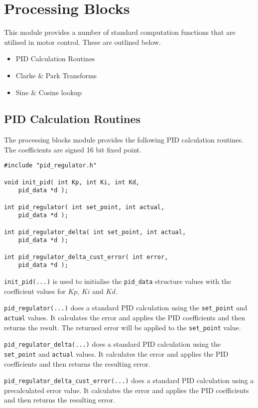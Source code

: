 \section{Processing Blocks}
This module provides a number of standard computation functions that are utilised in motor control. These are outlined below.

\begin{itemize}
\item PID Calculation Routines
\item Clarke \& Park Transforms
\item Sine \& Cosine lookup
\end{itemize}

\subsection{PID Calculation Routines}
The processing blocks module provides the following PID calculation routines. The coefficients are signed 16 bit fixed point.

\begin{lstlisting}
#include "pid_regulator.h"

void init_pid( int Kp, int Ki, int Kd, 
	pid_data *d );

int pid_regulator( int set_point, int actual, 
	pid_data *d );
	
int pid_regulator_delta( int set_point, int actual, 
	pid_data *d );
	
int pid_regulator_delta_cust_error( int error, 
	pid_data *d );
\end{lstlisting}

\verb=init_pid(...)= is used to initialise the \verb=pid_data= structure values with the coefficient values for $Kp$, $Ki$ and $Kd$.

\verb=pid_regulator(...)= does a standard PID calculation using the \verb=set_point= and \verb=actual= values. It calculates the error and applies the PID coefficients and then returns the result. The returned error will be applied to the \verb=set_point= value.

\verb=pid_regulator_delta(...)= does a standard PID calculation using the \verb=set_point= and \verb=actual= values. It calculates the error and applies the PID coefficients and then returns the resulting error.

\verb=pid_regulator_delta_cust_error(...)= does a standard PID calculation using a precalculated error value. It calculates the error and applies the PID coefficients and then returns the resulting error.

